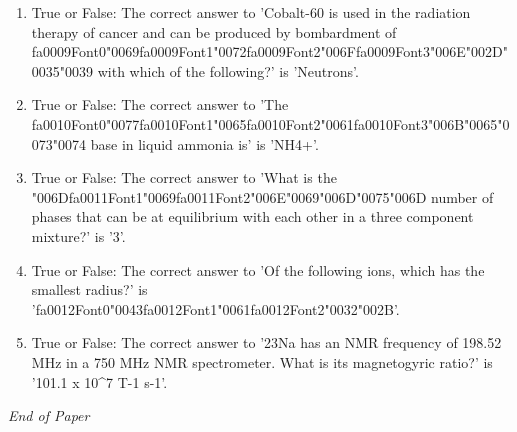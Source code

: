 \documentclass[12pt]{article}
\begin{document}
\begin{enumerate}[label=\arabic*.]
\item True or False: The correct answer to 'Cobalt-60 is used in the radiation therapy of cancer and can be produced by bombardment of {\csname fa0009Font0\endcsname\char"0069}{\csname fa0009Font1\endcsname\char"0072}{\csname fa0009Font2\endcsname\char"006F}{\csname fa0009Font3\endcsname\char"006E}{\char"002D}{\char"0035}{\char"0039} with which of the following?' is 'Neutrons'.
\item True or False: The correct answer to 'The {\csname fa0010Font0\endcsname\char"0077}{\csname fa0010Font1\endcsname\char"0065}{\csname fa0010Font2\endcsname\char"0061}{\csname fa0010Font3\endcsname\char"006B}{\char"0065}{\char"0073}{\char"0074} base in liquid ammonia is' is 'NH4+'.
\item True or False: The correct answer to 'What is the {\char"006D}{\csname fa0011Font1\endcsname\char"0069}{\csname fa0011Font2\endcsname\char"006E}{\char"0069}{\char"006D}{\char"0075}{\char"006D} number of phases that can be at equilibrium with each other in a three component mixture?' is '3'.
\item True or False: The correct answer to 'Of the following ions, which has the smallest radius?' is '{\csname fa0012Font0\endcsname\char"0043}{\csname fa0012Font1\endcsname\char"0061}{\csname fa0012Font2\endcsname\char"0032}{\char"002B}'.
\item True or False: The correct answer to '23Na has an NMR frequency of 198.52 MHz in a 750 MHz NMR spectrometer. What is its magnetogyric ratio?' is '101.1 x 10\^{}7 T-1 s-1'.
\end{enumerate}

\vfill
\noindent\textit{End of Paper}
\end{document}
